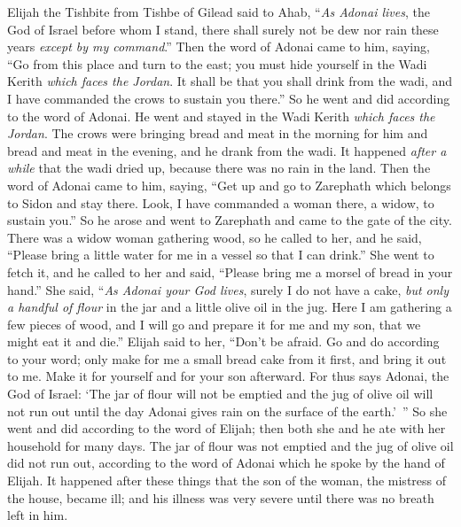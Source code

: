 \begin{biblechapter} %
 Elijah the Tishbite from Tishbe of Gilead said to Ahab, “\textit{As Adonai lives}, the God of Israel before whom I stand, there shall surely not be dew nor rain these years \textit{except by my command}.”
\verse Then the word of Adonai came to him, saying,
\verse “Go from this place and turn to the east; you must hide yourself in the Wadi Kerith \textit{which faces the Jordan}.
\verse It shall be that you shall drink from the wadi, and I have commanded the crows to sustain you there.”
\verse So he went and did according to the word of Adonai. He went and stayed in the Wadi Kerith \textit{which faces the Jordan}.
\verse The crows were bringing bread and meat in the morning for him and bread and meat in the evening, and he drank from the wadi.
\verse It happened \textit{after a while} that the wadi dried up, because there was no rain in the land.
\verse Then the word of Adonai came to him, saying,
\verse “Get up and go to Zarephath which belongs to Sidon and stay there. Look, I have commanded a woman there, a widow, to sustain you.”
\verse So he arose and went to Zarephath and came to the gate of the city. There was a widow woman gathering wood, so he called to her, and he said, “Please bring a little water for me in a vessel so that I can drink.”
\verse She went to fetch it, and he called to her and said, “Please bring me a morsel of bread in your hand.”
\verse She said, “\textit{As Adonai your God lives}, surely I do not have a cake, \textit{but only a handful of flour} in the jar and a little olive oil in the jug. Here I am gathering a few pieces of wood, and I will go and prepare it for me and my son, that we might eat it and die.”
\verse Elijah said to her, “Don’t be afraid. Go and do according to your word; only make for me a small bread cake from it first, and bring it out to me. Make it for yourself and for your son afterward.
\verse For thus says Adonai, the God of Israel: ‘The jar of flour will not be emptied and the jug of olive oil will not run out until the day Adonai gives rain on the surface of the earth.’ ”
\verse So she went and did according to the word of Elijah; then both she and he ate with her household for many days.
\verse The jar of flour was not emptied and the jug of olive oil did not run out, according to the word of Adonai which he spoke by the hand of Elijah.
\verse It happened after these things that the son of the woman, the mistress of the house, became ill; and his illness was very severe until there was no breath left in him.

\end{biblechapter}
